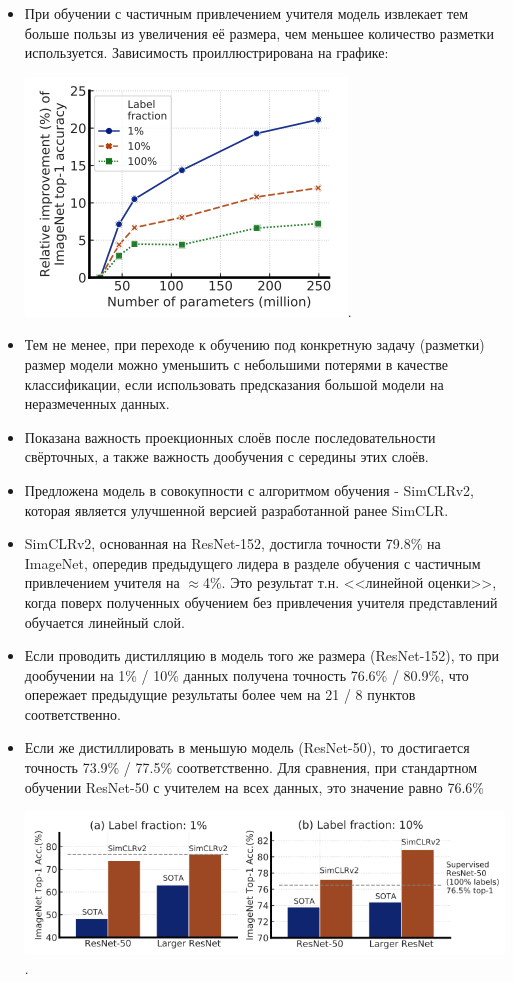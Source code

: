 \documentclass{article}
\begin{document}
\begin{itemize}
    \item При обучении с частичным привлечением учителя модель извлекает тем больше пользы из увеличения её размера, чем меньшее количество разметки используется. Зависимость проиллюстрирована на графике:
    
    
    \includegraphics[scale=0.6]{1st_result.png}.
    
    
    \item Тем не менее, при переходе к обучению под конкретную задачу (разметки) размер модели можно уменьшить с небольшими потерями в качестве классификации, если использовать предсказания большой модели на неразмеченных данных.
    \item Показана важность проекционных слоёв после последовательности свёрточных, а также важность дообучения с середины этих слоёв.
    \item Предложена модель в совокупности с алгоритмом обучения - SimCLRv2, которая является улучшенной версией разработанной ранее SimCLR.
    \item SimCLRv2, основанная на ResNet-152, достигла точности 79.8\% на ImageNet, опередив предыдущего лидера в разделе обучения с частичным привлечением учителя на $\approx$4\%. Это результат т.н. <<линейной оценки>>, когда поверх полученных обучением без привлечения учителя представлений обучается линейный слой.
    \item Если проводить дистилляцию в модель того же размера (ResNet-152), то при дообучении на 1\% / 10\% данных получена точность 76.6\% / 80.9\%, что опережает предыдущие результаты более чем на 21 / 8 пунктов соответственно.
    \item Если же дистиллировать в меньшую модель (ResNet-50), то достигается точность  73.9\% / 77.5\% соответственно. Для сравнения, при стандартном обучении ResNet-50 с учителем на всех данных, это значение равно 76.6\%
    
    
    \includegraphics[scale=0.5]{leaderboard.png}.
    
    
\end{itemize}
\end{document}

